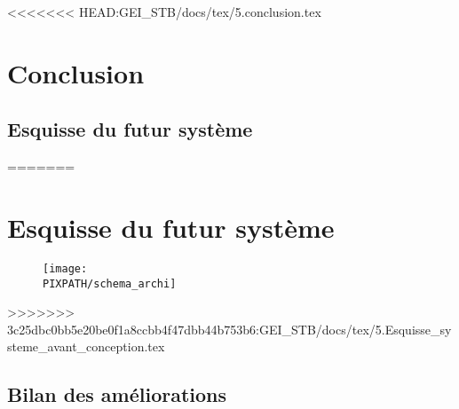 <<<<<<< HEAD:GEI_STB/docs/tex/5.conclusion.tex
\section{Conclusion}

\subsection{Esquisse du futur système}
=======
\section{Esquisse du futur système}

\begin{figure}[!h]
\begin{center}
    \texttt{[image: \\PIXPATH/schema\_archi]}
\end{center}
\end{figure}
\vfill
\pagebreak

>>>>>>> 3c25dbc0bb5e20be0f1a8ccbb4f47dbb44b753b6:GEI_STB/docs/tex/5.Esquisse_systeme_avant_conception.tex
%

\subsection{Bilan des améliorations}
